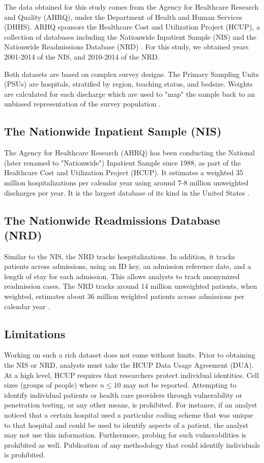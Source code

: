 \documentclass[12pt]{ociamthesis}\usepackage[]{graphicx}\usepackage[]{color}
\begin{document}
The data obtained for this study comes from the Agency for Healthcare Research and Quality (AHRQ),
under the Department of Health and Human Services (DHHS). ARHQ sponsors the
Healthcare Cost and Utilization Project (HCUP), a collection of databases including the Nationwide Inpatient Sample (NIS) and
the Nationwide Readmissions Database (NRD) \cite{HCUPOverview}. For this study, we obtained years 2001-2014 of the NIS, and
2010-2014 of the NRD.

Both datasets are based on complex survey designs. The Primary Sampling Units (PSUs) are hospitals, stratified by region,
teaching status, and bedsize. Weights are calculated for each discharge which are used to "map" the sample back to an unbiased
representation of the survey population \cite{Heeringa2017}.

\subsection{The Nationwide Inpatient Sample (NIS)}

The Agency for Healthcare Research (AHRQ) has been conducting the National (later renamed to "Nationwide") Inpatient
Sample since 1988, as part of the Healthcare Cost and Utilization Project (HCUP). It estimates a weighted 35 million
hospitalizations per calendar year using around 7-8 million unweighted discharges per year. It is the largest database
of its kind in the United States \cite{NISOverview}.

\subsection{The Nationwide Readmissions Database (NRD)}

Similar to the NIS, the NRD tracks hospitalizations. In addition, it tracks patients across admissions, using an ID key,
an admission reference date, and a length of stay for each admission. This allows analysts to track anonymized readmission cases.
The NRD tracks around 14 million unweighted patients, when weighted, estimates about 36 million weighted patients across admissions 
per calendar year \cite{NRDOverview}.

\subsection{Limitations}

Working on such a rich dataset does not come without limits. Prior to obtaining the NIS or NRD, analysts must take the HCUP
Data Usage Agreement (DUA). At a high level, HCUP requires that researchers protect individual identities. Cell sizes (groups of people)
where $n \le 10$ may not be reported. Attempting to identify individual patients or health care providers through vulnerability or penetration testing, 
or any other means, is prohibited. For instance, if an analyst noticed that a certain hospital used a particular coding scheme that was unique 
to that hospital and could be used to identify aspects of a patient, the analyst may not use this information. Furthermore, probing for such
vulnerabilities is prohibited as well. Publication of any methodology that could identify individuals is prohibited.
\end{document}

